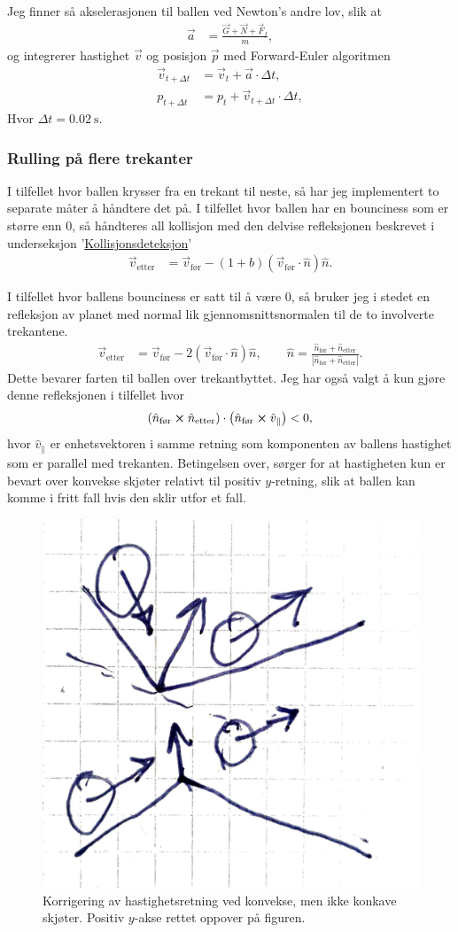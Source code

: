 \documentclass[norsk, doc, 11pt, a4paper]{apa7}  %
\begin{document}
Jeg finner så akselerasjonen til ballen ved Newton's andre lov, slik at
\begin{align*}
	\vec{a} &= \frac{\vec{G}+\vec{N}+\vec{F}_{f}}{m},
\end{align*}
og integrerer hastighet \(\vec{v}\) og posisjon \(\vec{p}\) med Forward-Euler algoritmen
\begin{align*}
	\vec{v}_{t+\Delta t} &= \vec{v}_{t} + \vec{a}\cdot\Delta t, \\
	p_{t+\Delta t} &= p_{t} + \vec{v}_{t+\Delta t}\cdot \Delta t,
\end{align*}
Hvor \(\Delta t = \SI{0.02}{\second}\).

\subsubsection{Rulling på flere trekanter}
I tilfellet hvor ballen krysser fra en trekant til neste, så har jeg implementert to separate måter å håndtere det på. I tilfellet hvor ballen har en bounciness som er større enn \(0\), så håndteres all kollisjon med den delvise refleksjonen beskrevet i underseksjon '\hyperref[sec:3:A]{Kollisjonsdeteksjon}'
\begin{align*}
	\vec{v}_{\text{etter}} &= \vec{v}_{\text{før}} - \left(1+b\right)\left(\vec{v}_{\text{før}}\cdot\hat{n}\right)\hat{n}.
\end{align*}

I tilfellet hvor ballens bounciness er satt til å være \(0\), så bruker jeg i stedet en refleksjon av planet med normal lik gjennomsnittsnormalen til de to involverte trekantene.
\begin{align*}
	\vec{v}_{\text{etter}} &= \vec{v}_{\text{før}} - 2\left(\vec{v}_{\text{før}}\cdot\hat{n}\right)\hat{n},
	\qquad
	\hat{n} = \frac{\hat{n}_{\text{før}}+\hat{n}_{\text{etter}}}{|\hat{n}_{\text{før}}+\hat{n}_{\text{etter}}|}.
\end{align*}
Dette bevarer farten til ballen over trekantbyttet. Jeg har også valgt å kun gjøre denne refleksjonen i tilfellet hvor
\begin{align*}
	\left(\hat{n}_{\text{før}}\cross \hat{n}_{\text{etter}}\right)\cdot\left(\hat{n}_{\text{før}}\cross \hat{v}_{\parallel}\right) < 0,
\end{align*}
hvor \(\hat{v}_{\parallel}\) er enhetsvektoren i samme retning som komponenten av ballens hastighet som er parallel med trekanten.
Betingelsen over, sørger for at hastigheten kun er bevart over konvekse skjøter relativt til positiv \(y\)-retning, slik at ballen kan komme i fritt fall hvis den sklir utfor et fall.
\begin{figure}[H]
	\centering
	\includegraphics[width=.25\textwidth]{figs/refleksjon.pdf}
	\caption{Korrigering av hastighetsretning ved konvekse, men ikke konkave skjøter. Positiv \(y\)-akse rettet oppover på figuren.}
\end{figure}
\end{document}
